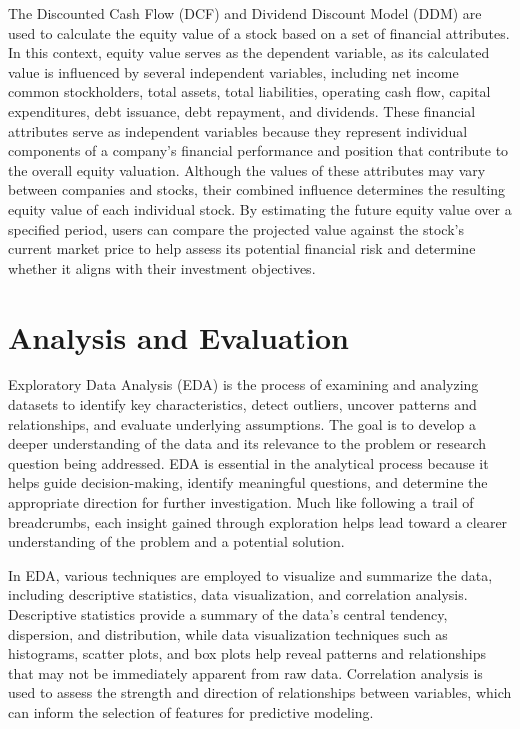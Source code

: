 \documentclass[runningheads]{llncs}
\begin{document}
The Discounted Cash Flow (DCF) and Dividend Discount Model (DDM) are used to calculate the equity value of a stock based on a set of financial attributes. In this context, equity value serves as the dependent variable, as its calculated value is influenced by several independent variables, including net income common stockholders, total assets, total liabilities, operating cash flow, capital expenditures, debt issuance, debt repayment, and dividends. These financial attributes serve as independent variables because they represent individual components of a company's financial performance and position that contribute to the overall equity valuation. Although the values of these attributes may vary between companies and stocks, their combined influence determines the resulting equity value of each individual stock. By estimating the future equity value over a specified period, users can compare the projected value against the stock's current market price to help assess its potential financial risk and determine whether it aligns with their investment objectives.

\section{Analysis and Evaluation}

Exploratory Data Analysis (EDA) is the process of examining and analyzing datasets to identify key characteristics, detect outliers, uncover patterns and relationships, and evaluate underlying assumptions. The goal is to develop a deeper understanding of the data and its relevance to the problem or research question being addressed. EDA is essential in the analytical process because it helps guide decision-making, identify meaningful questions, and determine the appropriate direction for further investigation. Much like following a trail of breadcrumbs, each insight gained through exploration helps lead toward a clearer understanding of the problem and a potential solution.

In EDA, various techniques are employed to visualize and summarize the data, including descriptive statistics, data visualization, and correlation analysis. Descriptive statistics provide a summary of the data's central tendency, dispersion, and distribution, while data visualization techniques such as histograms, scatter plots, and box plots help reveal patterns and relationships that may not be immediately apparent from raw data. Correlation analysis is used to assess the strength and direction of relationships between variables, which can inform the selection of features for predictive modeling.
\end{document}
